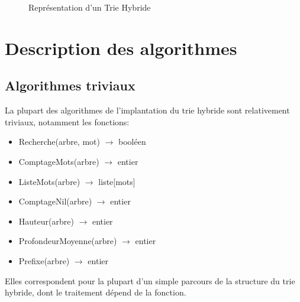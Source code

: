 \documentclass[a4paper,12pt]{report}
\begin{document}
\begin{center}
\end{center}

\begin{figure}[!htbp]
\caption{Représentation d'un Trie Hybride}
\end{figure}

\section{Description des algorithmes}
\subsection{Algorithmes triviaux}
La plupart des algorithmes de l'implantation du trie hybride sont relativement triviaux, notamment
les fonctions:
\begin{itemize}
 \item Recherche(arbre, mot) $\rightarrow$ booléen
 \item ComptageMots(arbre) $\rightarrow$ entier
 \item ListeMots(arbre) $\rightarrow$ liste[mots]
 \item ComptageNil(arbre) $\rightarrow$ entier
 \item Hauteur(arbre) $\rightarrow$ entier
 \item ProfondeurMoyenne(arbre) $\rightarrow$ entier
 \item Prefixe(arbre) $\rightarrow$ entier
\end{itemize}
Elles correspondent pour la plupart d'un simple parcours de la structure du trie hybride, dont le traitement
dépend de la fonction.
\end{document}
